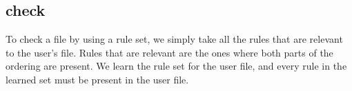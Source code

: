 \subsection{check}
  To check a file by using a rule set, we simply take all the rules that are relevant to the user's file.
  Rules that are relevant are the ones where both parts of the ordering are present.
  We learn the rule set for the user file, and every rule in the learned set must be present in the user file.

%
%
%
%
%

